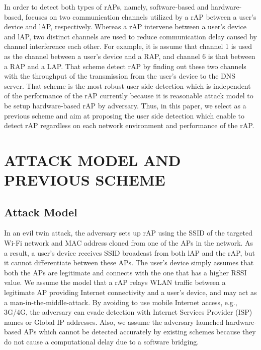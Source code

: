 \documentclass[conference]{IEEEtran}
\begin{document}
In order to detect both types of rAPs, namely, software-based and hardware-based, \cite{previous} focuses on two communication channels utilized by a rAP between a user's device and lAP, respectively.
Whereas a rAP intervene between a user's device and lAP, two distinct channels are used to reduce communication delay caused by channel interference each other.
For example, it is assume that channel 1 is used as the channel between a user's device and a RAP, and channel 6 is that between a RAP and a LAP.
That scheme detect rAP by finding out these two channels with the throughput of the transmission from the user's device to the DNS server.
That scheme is the most robust user side detection which is independent of the performance of the rAP currently because it is reasonable attack model to be setup hardware-based rAP by adversary.
Thus, in this paper, we select \cite{previous} as a previous scheme and aim at proposing the user side detection which enable to detect rAP regardless on each network environment and performance of the rAP.



\section{ATTACK MODEL AND PREVIOUS SCHEME}
\subsection{Attack Model}
In an evil twin attack, the adversary sets up rAP using the SSID of the targeted Wi-Fi network and MAC address cloned from one of the APs in the network.
As a result, a user's device receives SSID broadcast from both lAP and the rAP, but it cannot differentiate between these APs.
The user's device simply assumes that both the APs are legitimate and connects with the one that has a higher RSSI value.
We assume the model that a rAP relays WLAN traffic between a legitimate AP providing Internet connectivity and a user's device, and may act as a man-in-the-middle-attack.
By avoiding to use mobile Internet access, e.g., 3G/4G, the adversary can evade detection with Internet Services Provider (ISP) names or Global IP addresses\cite{rtt}.
Also, we assume the adversary launched hardware-based APs which cannot be detected accurately by existing schemes because they do not cause a computational delay due to a software bridging.
\end{document}
